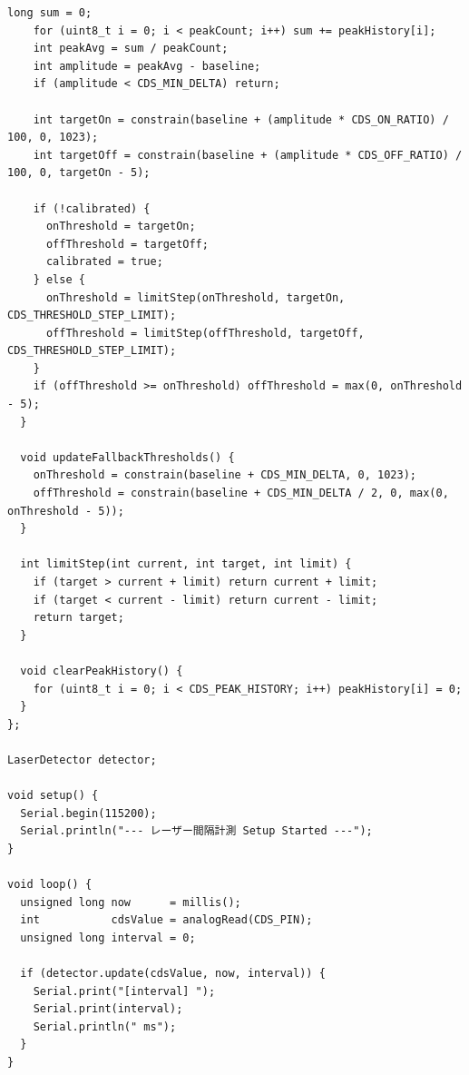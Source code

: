 \begin{lstlisting}[caption={LaserIntervalTest.ino}, label={lst:laser_full}]
    long sum = 0;
    for (uint8_t i = 0; i < peakCount; i++) sum += peakHistory[i];
    int peakAvg = sum / peakCount;
    int amplitude = peakAvg - baseline;
    if (amplitude < CDS_MIN_DELTA) return;

    int targetOn = constrain(baseline + (amplitude * CDS_ON_RATIO) / 100, 0, 1023);
    int targetOff = constrain(baseline + (amplitude * CDS_OFF_RATIO) / 100, 0, targetOn - 5);

    if (!calibrated) {
      onThreshold = targetOn;
      offThreshold = targetOff;
      calibrated = true;
    } else {
      onThreshold = limitStep(onThreshold, targetOn, CDS_THRESHOLD_STEP_LIMIT);
      offThreshold = limitStep(offThreshold, targetOff, CDS_THRESHOLD_STEP_LIMIT);
    }
    if (offThreshold >= onThreshold) offThreshold = max(0, onThreshold - 5);
  }

  void updateFallbackThresholds() {
    onThreshold = constrain(baseline + CDS_MIN_DELTA, 0, 1023);
    offThreshold = constrain(baseline + CDS_MIN_DELTA / 2, 0, max(0, onThreshold - 5));
  }

  int limitStep(int current, int target, int limit) {
    if (target > current + limit) return current + limit;
    if (target < current - limit) return current - limit;
    return target;
  }

  void clearPeakHistory() {
    for (uint8_t i = 0; i < CDS_PEAK_HISTORY; i++) peakHistory[i] = 0;
  }
};

LaserDetector detector;

void setup() {
  Serial.begin(115200);
  Serial.println("--- レーザー間隔計測 Setup Started ---");
}

void loop() {
  unsigned long now      = millis();
  int           cdsValue = analogRead(CDS_PIN);
  unsigned long interval = 0;

  if (detector.update(cdsValue, now, interval)) {
    Serial.print("[interval] ");
    Serial.print(interval);
    Serial.println(" ms");
  }
}
\end{lstlisting}
